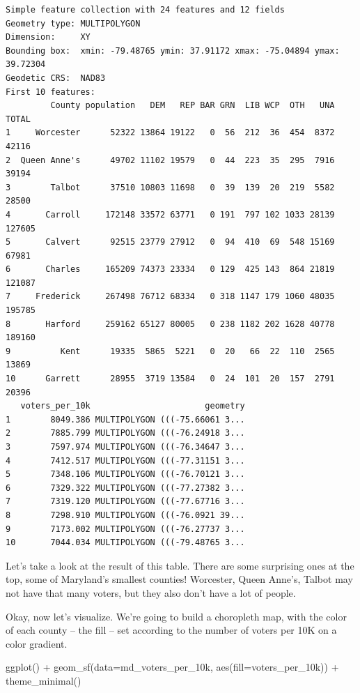 \documentclass[
  letterpaper,
  DIV=11,
  numbers=noendperiod]{scrreprt}
\newenvironment{Shaded}{\begin{snugshade}}{\end{snugshade}}
\newcommand{\AttributeTok}[1]{\textcolor[rgb]{0.40,0.45,0.13}{#1}}
\newcommand{\FunctionTok}[1]{\textcolor[rgb]{0.28,0.35,0.67}{#1}}
\newcommand{\NormalTok}[1]{\textcolor[rgb]{0.00,0.23,0.31}{#1}}
\newcommand{\SpecialCharTok}[1]{\textcolor[rgb]{0.37,0.37,0.37}{#1}}
\begin{document}
\begin{verbatim}
Simple feature collection with 24 features and 12 fields
Geometry type: MULTIPOLYGON
Dimension:     XY
Bounding box:  xmin: -79.48765 ymin: 37.91172 xmax: -75.04894 ymax: 39.72304
Geodetic CRS:  NAD83
First 10 features:
         County population   DEM   REP BAR GRN  LIB WCP  OTH   UNA  TOTAL
1     Worcester      52322 13864 19122   0  56  212  36  454  8372  42116
2  Queen Anne's      49702 11102 19579   0  44  223  35  295  7916  39194
3        Talbot      37510 10803 11698   0  39  139  20  219  5582  28500
4       Carroll     172148 33572 63771   0 191  797 102 1033 28139 127605
5       Calvert      92515 23779 27912   0  94  410  69  548 15169  67981
6       Charles     165209 74373 23334   0 129  425 143  864 21819 121087
7     Frederick     267498 76712 68334   0 318 1147 179 1060 48035 195785
8       Harford     259162 65127 80005   0 238 1182 202 1628 40778 189160
9          Kent      19335  5865  5221   0  20   66  22  110  2565  13869
10      Garrett      28955  3719 13584   0  24  101  20  157  2791  20396
   voters_per_10k                       geometry
1        8049.386 MULTIPOLYGON (((-75.66061 3...
2        7885.799 MULTIPOLYGON (((-76.24918 3...
3        7597.974 MULTIPOLYGON (((-76.34647 3...
4        7412.517 MULTIPOLYGON (((-77.31151 3...
5        7348.106 MULTIPOLYGON (((-76.70121 3...
6        7329.322 MULTIPOLYGON (((-77.27382 3...
7        7319.120 MULTIPOLYGON (((-77.67716 3...
8        7298.910 MULTIPOLYGON (((-76.0921 39...
9        7173.002 MULTIPOLYGON (((-76.27737 3...
10       7044.034 MULTIPOLYGON (((-79.48765 3...
\end{verbatim}

Let's take a look at the result of this table. There are some surprising
ones at the top, some of Maryland's smallest counties! Worcester, Queen
Anne's, Talbot may not have that many voters, but they also don't have a
lot of people.

Okay, now let's visualize. We're going to build a choropleth map, with
the color of each county -- the fill -- set according to the number of
voters per 10K on a color gradient.

\begin{Shaded}
\begin{Highlighting}[]
\FunctionTok{ggplot}\NormalTok{() }\SpecialCharTok{+}
  \FunctionTok{geom\_sf}\NormalTok{(}\AttributeTok{data=}\NormalTok{md\_voters\_per\_10k, }\FunctionTok{aes}\NormalTok{(}\AttributeTok{fill=}\NormalTok{voters\_per\_10k)) }\SpecialCharTok{+}
  \FunctionTok{theme\_minimal}\NormalTok{()}
\end{Highlighting}
\end{Shaded}
\end{document}
